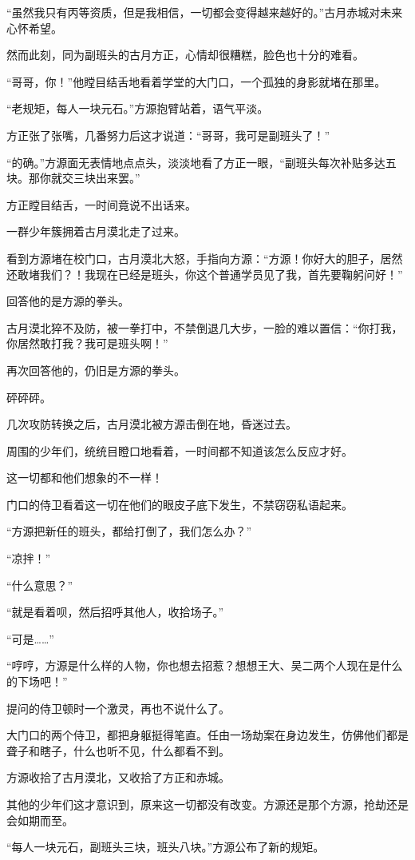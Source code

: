 \begin{this_body}
“虽然我只有丙等资质，但是我相信，一切都会变得越来越好的。”古月赤城对未来心怀希望。

然而此刻，同为副班头的古月方正，心情却很糟糕，脸色也十分的难看。

“哥哥，你！”他瞠目结舌地看着学堂的大门口，一个孤独的身影就堵在那里。

“老规矩，每人一块元石。”方源抱臂站着，语气平淡。

方正张了张嘴，几番努力后这才说道：“哥哥，我可是副班头了！”

“的确。”方源面无表情地点点头，淡淡地看了方正一眼，“副班头每次补贴多达五块。那你就交三块出来罢。”

方正瞠目结舌，一时间竟说不出话来。

一群少年簇拥着古月漠北走了过来。

看到方源堵在校门口，古月漠北大怒，手指向方源：“方源！你好大的胆子，居然还敢堵我们？！我现在已经是班头，你这个普通学员见了我，首先要鞠躬问好！”

回答他的是方源的拳头。

古月漠北猝不及防，被一拳打中，不禁倒退几大步，一脸的难以置信：“你打我，你居然敢打我？我可是班头啊！”

再次回答他的，仍旧是方源的拳头。

砰砰砰。

几次攻防转换之后，古月漠北被方源击倒在地，昏迷过去。

周围的少年们，统统目瞪口地看着，一时间都不知道该怎么反应才好。

这一切都和他们想象的不一样！

门口的侍卫看着这一切在他们的眼皮子底下发生，不禁窃窃私语起来。

“方源把新任的班头，都给打倒了，我们怎么办？”

“凉拌！”

“什么意思？”

“就是看着呗，然后招呼其他人，收拾场子。”

“可是……”

“哼哼，方源是什么样的人物，你也想去招惹？想想王大、吴二两个人现在是什么的下场吧！”

提问的侍卫顿时一个激灵，再也不说什么了。

大门口的两个侍卫，都把身躯挺得笔直。任由一场劫案在身边发生，仿佛他们都是聋子和瞎子，什么也听不见，什么都看不到。

方源收拾了古月漠北，又收拾了方正和赤城。

其他的少年们这才意识到，原来这一切都没有改变。方源还是那个方源，抢劫还是会如期而至。

“每人一块元石，副班头三块，班头八块。”方源公布了新的规矩。


\end{this_body}
